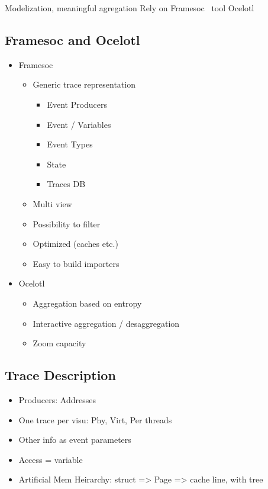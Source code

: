 Modelization, meaningful agregation
Rely on Framesoc~\cite{Pagano14frameSoC} tool Ocelotl~\cite{Dosimont14Ocelotl}

\subsection{Framesoc and Ocelotl}

\begin{itemize}
    \item \gls{Framesoc}
        \begin{itemize}
            \item Generic trace representation
                \begin{itemize}
                    \item Event Producers
                    \item Event / Variables
                    \item Event Types
                    \item State
                    \item Traces DB
                \end{itemize}
            \item Multi view
            \item Possibility to filter
            \item Optimized (caches etc.)
            \item Easy to build importers
        \end{itemize}
    \item \gls{Ocelotl}~\cite{Pagano13TraceRR}
        \begin{itemize}
            \item Aggregation based on entropy
            \item Interactive aggregation / desaggregation
            \item Zoom capacity
        \end{itemize}
\end{itemize}

\subsection{Trace Description}

\begin{itemize}
    \item Producers: Addresses
    \item One trace per visu: Phy, Virt, Per threads
    \item Other info as event parameters
    \item Access = variable
    \item Artificial Mem Heirarchy: struct => Page => cache line, with tree
\end{itemize}

